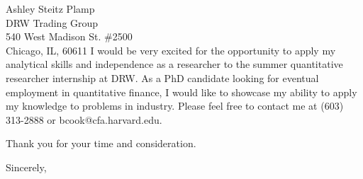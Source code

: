 \documentclass{letter}
\begin{document}
\begin{letter}{Ashley Steitz Plamp\\
    DRW Trading Group\\ 540 West Madison St. \#2500\\ Chicago, IL, 60611}
\noindent I would be very excited for the opportunity to apply my
analytical skills and independence as a researcher to the summer
quantitative researcher internship at DRW. As a PhD candidate
looking for eventual employment in quantitative finance, I would like
to showcase my ability to apply my knowledge to problems in industry.
Please feel free to contact me at (603) 313-2888 or
bcook@cfa.harvard.edu.

Thank you for your time and consideration.


\closing{Sincerely,}


\end{letter}
\end{document}
